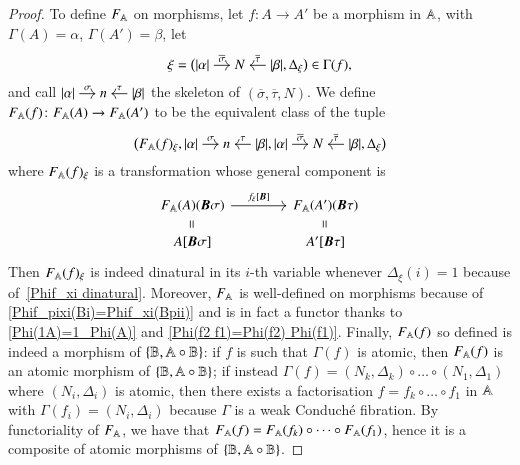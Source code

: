 \begin{proof}
    To define $F_\mathbb A$ on morphisms, let $f \colon A \to A'$ be a morphism in $\mathbb A$, with $\Gamma(A)=\alpha$, $\Gamma(A')=\beta$, let
    \[
    \xi = \bigl(
    \begin{tikzcd}[cramped,sep=small]
    \length\alpha \ar[r,"\overline\sigma"] & N & \length\beta \ar[l,"\overline\tau"']
    \end{tikzcd},
    \Delta_\xi
    \bigr) \in \Gamma(f),
    \]
    and call 
    $
    \begin{tikzcd}[cramped,sep=small]
    \length\alpha \ar[r,"\sigma"] & n & \length\beta \ar[l,"\tau"']
    \end{tikzcd}
    $
    the skeleton of $(\overline\sigma,\overline\tau,N)$. We define $F_\mathbb A (f) \colon F_\mathbb A(A) \to F_\mathbb A(A')$ to be the equivalent class of the tuple
    \[
    \bigl(
    F_\A (f)_\xi,
    \begin{tikzcd}[cramped,sep=small]
    \length\alpha \ar[r,"\sigma"] & n & \length\beta \ar[l,"\tau"']
    \end{tikzcd},
    \begin{tikzcd}[cramped,sep=small]
    \length\alpha \ar[r,"\overline\sigma"] & N & \length\beta \ar[l,"\overline\tau"']
    \end{tikzcd},
    \Delta_\xi
    \bigr)
    \]
    where $F_\mathbb A(f)_\xi$ is a transformation whose general component is
    \[
    \begin{tikzcd}[row sep=1em,column sep=4em]
    F_\A(A)(\bfB\sigma) \ar[d,phantom,"\rotatebox{90}="] \ar[r,"{f_\xi[\bfB]}"] & F_\A(A')(\bfB\tau) \ar[d,phantom,"\rotatebox{90} ="] \\
    A[\bfB\sigma] & A'[\bfB\tau]
    \end{tikzcd}
    \]
    Then $F_\mathbb A(f)_\xi$ is indeed dinatural in its $i$-th variable whenever $\Delta_\xi(i)=1$ because of~\ref{Phif_xi dinatural}.  Moreover, $F_\mathbb A$ is well-defined on morphisms because of \ref{Phif_pixi(Bi)=Phif_xi(Bpii)} and is in fact a functor thanks to \ref{Phi(1A)=1_Phi(A)} and \ref{Phi(f2 f1)=Phi(f2) Phi(f1)}. Finally, $F_\mathbb A(f)$ so defined is indeed a morphism of $\{ \mathbb B,\mathbb A \circ \mathbb B\}$: if $f$ is such that $\Gamma(f)$ is atomic, then $F_\mathbb A(f)$ is an atomic morphism of $\{ \mathbb B,\mathbb A \circ \mathbb B\}$; if instead $\Gamma(f)=(N_k,\Delta_k) \circ \dots \circ (N_1,\Delta_1)$ where $(N_i,\Delta_i)$ is atomic, then there exists a factorisation $f=f_k \circ \dots \circ f_1$ in $\mathbb A$ with $\Gamma(f_i)=(N_i,\Delta_i)$ because $\Gamma$ is a weak Conduché fibration. By functoriality of $F_\mathbb A$, we have that $F_\mathbb A(f)=F_\mathbb A(f_k) \circ \dots \circ F_\mathbb A(f_1)$, hence it is a composite of atomic morphisms of $\{ \mathbb B,\mathbb A \circ \mathbb B\}$.
    

\end{proof}
